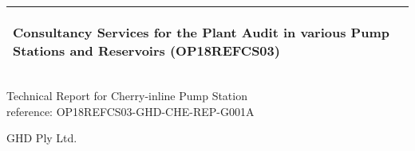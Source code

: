 %
\begin{titlepage}
  \addtolength{\hoffset}{0.5\evensidemargin-0.5\oddsidemargin} %
  \noindent%
  \begin{tabular}{@{}p{\textwidth}@{}}
    \toprule[2pt]
    \midrule
    \vspace{0.2cm}
    \begin{center}
    \Huge{\textbf{
      Consultancy Services for the Plant Audit in various Pump Stations and Reservoirs (OP18REFCS03) %
    }}
    \end{center}
    \begin{center}
      \Large{
      }
    \end{center}
    \vspace{0.2cm}\\
    \midrule
    \toprule[2pt]
  \end{tabular}
  \vspace{4 cm}
  \begin{center}
    {\large
      Technical Report for Cherry-inline Pump Station%
    }\\
    \vspace{0.2cm}
    {\Large
      reference: OP18REFCS03-GHD-CHE-REP-G001A%
    }
  \end{center}
  \vfill
  \begin{center}
  GHD Ply Ltd.\\
  \end{center}
\end{titlepage}
\clearpage